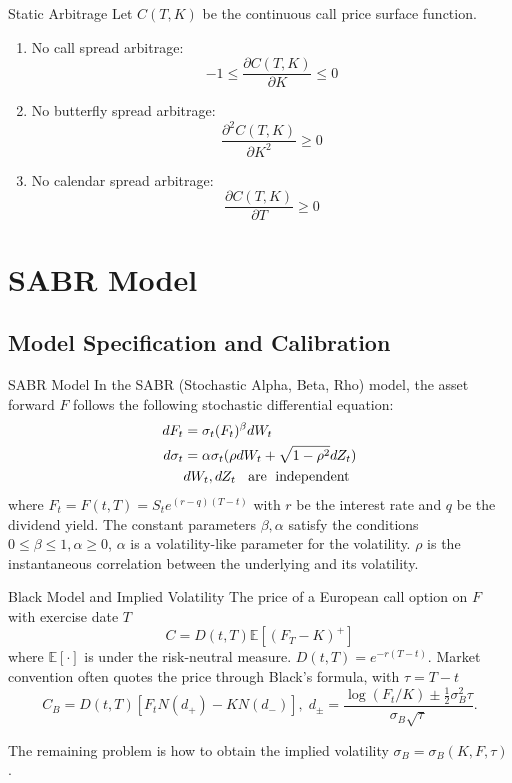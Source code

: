 \documentclass[10pt,table,mathserif]{beamer}
\begin{document}
\begin{frame}{Static Arbitrage}
Let  $C(T,K)$ be the continuous call price surface function.
\begin{enumerate}
		\item No call spread arbitrage:
		\[
		-1 \leq \frac{\partial C(T,K)}{ \partial K} \leq 0
		\]
		\item  No butterfly spread arbitrage:
		\[
		\frac{\partial^2 C(T,K)}{ \partial K^2} \geq 0
		\]
		\item  No calendar spread arbitrage:
		\[
		\frac{\partial C(T,K)}{ \partial T} \geq 0
		\]
\end{enumerate}
\end{frame}


\section{SABR Model}
\subsection{Model Specification and Calibration}

\begin{frame}{SABR Model}
In the SABR (Stochastic Alpha, Beta, Rho)  model, the asset forward $F$ follows the following stochastic differential equation:
\[
\begin{split}
dF_t&=\sigma_t (F_t)^{\beta}dW_t\\
d\sigma_t&=\alpha \sigma_t( \rho dW_t+\sqrt{1-\rho^2} dZ_t)\\
&dW_t, dZ_t \; \text{\; are\; independent}
\end{split}
\]
where $F_t=F(t,T)=S_te^{(r-q)(T-t)}$ with $r$ be the interest rate and $q$ be the dividend yield.  The constant parameters $\beta ,\alpha$  satisfy the conditions $0\leq \beta \leq 1,\alpha \geq 0$, $\alpha$  is a volatility-like parameter for the volatility. $ \rho$  is the instantaneous correlation between the underlying and its volatility.
\end{frame}

\begin{frame}{Black Model and Implied Volatility}
The price of a European call option on $F$ with exercise date
$T$
\[
C = D(t,T){\mathbb E}[(F_{T}-K)^+]
\]
where ${\mathbb E}[\cdot]$ is under the risk-neutral measure. $D(t,T)=e^{-r(T-t)}$. Market convention often
quotes the price through Black's formula, with $\tau=T-t$
\[
C_B =  D(t,T)[F_tN(d_+)-KN(d_-)], \; d_{\pm} =
\frac{\log(F_t/K)\pm \frac{1}{2}\sigma_B^2
	\tau}{\sigma_B\sqrt{\tau}}.
\]

The remaining problem is how to obtain the implied volatility $\sigma_B=\sigma_B(K,F,\tau)$.
\end{frame}
\end{document}
